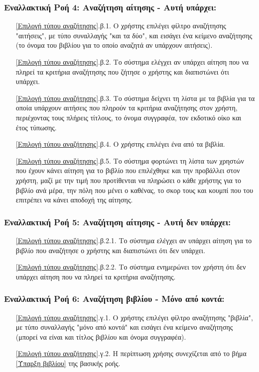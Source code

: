 \documentclass[12pt,a4paper]{article}
\begin{document}
\subsubsection*{Εναλλακτική Ροή 4: Αναζήτηση αίτησης - Αυτή υπάρχει:}
\begin{enumerate}
    \item[\ref{Επιλογή τύπου αναζήτησης}.β.1.] Ο χρήστης επιλέγει φίλτρο αναζήτησης "αιτήσεις", με τύπο συναλλαγής "και τα δύο", και εισάγει ένα κείμενο αναζήτησης (το όνομα του βιβλίου για το οποίο αναζητά αν υπάρχουν αιτήσεις).
    \item[\ref{Επιλογή τύπου αναζήτησης}.β.2.] Το σύστημα ελέγχει αν υπάρχει αίτηση που να πληρεί τα κριτήρια αναζήτησης που ζήτησε ο χρήστης και διαπιστώνει ότι υπάρχει.
    \item[\ref{Επιλογή τύπου αναζήτησης}.β.3.] Το σύστημα δείχνει τη λίστα με τα βιβλία για τα οποία υπάρχουν αιτήσεις που πληρούν τα κριτήρια αναζήτησης στον χρήστη, περιέχοντας τους πλήρεις τίτλους, το όνομα συγγραφέα, τον εκδοτικό οίκο και έτος τύπωσης.
    \item[\ref{Επιλογή τύπου αναζήτησης}.β.4.] Ο χρήστης επιλέγει ένα από τα βιβλία.
    \item[\ref{Επιλογή τύπου αναζήτησης}.β.5.] Το σύστημα φορτώνει τη λίστα των χρηστών που έχουν κάνει αίτηση για το βιβλίο που επιλέχθηκε και την προβάλλει στον χρήστη, μαζί με την τιμή που προτίθενται να πληρώσει ο κάθε χρήστης για το βιβλίο ανά μέρα, την πόλη που μένει ο καθένας, το σκορ τους και κουμπί που του επιτρέπει να κάνει αποδοχή της αίτησης.
\end{enumerate}

\subsubsection*{Εναλλακτική Ροή 5: Αναζήτηση αίτησης - Αυτή δεν υπάρχει:}
\begin{enumerate}
    \item[\ref{Επιλογή τύπου αναζήτησης}.β.2.1.] Το σύστημα ελέγχει αν υπάρχει αίτηση για το βιβλίο που αναζήτησε ο χρήστης και διαπιστώνει ότι δεν υπάρχει.
    \item[\ref{Επιλογή τύπου αναζήτησης}.β.2.2.] Το σύστημα ενημερώνει τον χρήστη ότι δεν υπάρχει αίτηση που να πληρεί τα κριτήρια αναζήτησης.
\end{enumerate}

\subsubsection*{Εναλλακτική Ροή 6: Αναζήτηση βιβλίου - Μόνο από κοντά:}
\begin{enumerate}
    \item[\ref{Επιλογή τύπου αναζήτησης}.γ.1.] Ο χρήστης επιλέγει φίλτρο αναζήτησης "βιβλία", με τύπο συναλλαγής "μόνο από κοντά" και εισάγει ένα κείμενο αναζήτησης (μπορεί να είναι και τίτλος βιβλίου και όνομα συγγραφέα).
    \item[\ref{Επιλογή τύπου αναζήτησης}.γ.2.] Η περίπτωση χρήσης συνεχίζεται από το βήμα \ref{Ύπαρξη βιβλίου} της βασικής ροής.
\end{enumerate}
\end{document}
